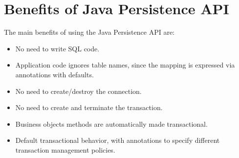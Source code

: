 \section{Benefits of Java Persistence API}

The main benefits of using the Java Persistence API are: 
\begin{itemize}
    \item No need to write SQL code.
    \item Application code ignores table names, since the mapping is expressed via annotations with defaults. 
    \item No need to create/destroy the connection. 
    \item No need to create and terminate the transaction. 
    \item Business objects methods are automatically made transactional. 
    \item Default transactional behavior, with annotations to specify different transaction management policies. 
\end{itemize}
